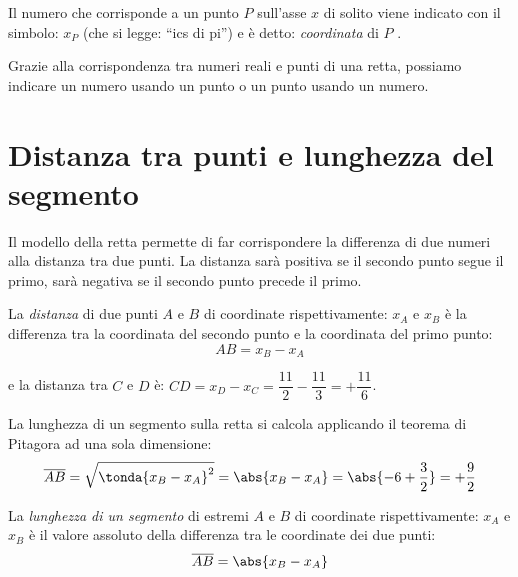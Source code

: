 \vspace{.5em}
Il numero che corrisponde a un punto \(P\) sull'asse \(x\) 
di solito viene indicato con il simbolo: \(x_P\) (che si legge: 
``ics di pi'') e è detto: \emph{coordinata} di \(P\) .

Grazie alla corrispondenza tra numeri reali e punti di una retta, 
possiamo indicare un numero usando un punto o un punto usando un numero.

\section{Distanza tra punti e lunghezza del segmento}
\label{sec:topologiadistanza}

Il modello della retta permette di far corrispondere la differenza di due 
numeri alla distanza tra due punti. 
La distanza sarà positiva se il secondo punto segue il primo, sarà negativa 
se il secondo punto precede il primo.

\begin{newdef}{}{}
La \emph{distanza} di due punti \(A\) e \(B\) di coordinate 
rispettivamente:
\(x_A\) e \(x_B\) è la differenza tra la coordinata del secondo punto e la 
coordinata del primo punto: 
\[AB = x_B -x_A\]
\end{newdef}

\vspace{.5em}

\noindent e la distanza tra \(C\) e \(D\) è: \quad
\(CD = x_D - x_C = \dfrac{11}{2} - \dfrac{11}{3} = +\dfrac{11}{6}\).

La lunghezza di un segmento sulla retta si calcola applicando il teorema di 
Pitagora ad una sola dimensione:
\[\overline{AB} = \sqrt{\tonda{x_B - x_A}^2} = \abs{x_B - x_A}=
  \abs{-6 + \dfrac{3}{2}} = +\dfrac{9}{2}\]

\begin{newdef}{}{}
La \emph{lunghezza di un segmento} di estremi \(A\) e \(B\) di coordinate 
rispettivamente:
\(x_A\) e \(x_B\) è il valore assoluto della differenza tra le coordinate 
dei due punti: 
\[\overline{AB} = \abs{x_B -x_A}\]
\end{newdef}

\newcommand{\lung}[2]{\mathcal{L}\punto{#1}{#2}}

